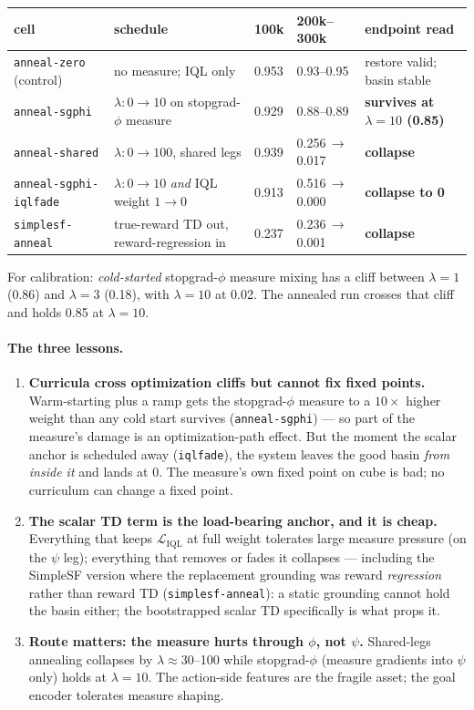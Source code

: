 \documentclass[11pt]{article}
\newcommand{\numgood}[1]{\textbf{\textcolor{green!45!black}{#1}}}
\newcommand{\numbad}[1]{\textbf{\textcolor{red!65!black}{#1}}}
\begin{document}
\begin{center}\small\begin{tabular}{lllll}
\toprule
cell & schedule & 100k & 200k--300k & endpoint read \\
\midrule
\texttt{anneal-zero} (control) & no measure; IQL only & 0.953 & 0.93--0.95 & restore valid; basin stable \\
\texttt{anneal-sgphi} & $\lambda:0\to10$ on stopgrad-$\phi$ measure & 0.929 & 0.88--0.89 & \numgood{survives at $\lambda{=}10$ (0.85)} \\
\texttt{anneal-shared} & $\lambda:0\to100$, shared legs & 0.939 & 0.256\,$\to$\,0.017 & \numbad{collapse} \\
\texttt{anneal-sgphi-iqlfade} & $\lambda:0\to10$ \emph{and} IQL weight $1\to0$ & 0.913 & 0.516\,$\to$\,0.000 & \numbad{collapse to 0} \\
\texttt{simplesf-anneal} & true-reward TD out, reward-regression in & 0.237 & 0.236\,$\to$\,0.001 & \numbad{collapse} \\
\bottomrule
\end{tabular}\end{center}

For calibration: \emph{cold-started} stopgrad-$\phi$ measure mixing has a cliff between
$\lambda=1$ (0.86) and $\lambda=3$ (0.18), with $\lambda=10$ at 0.02. The annealed run
crosses that cliff and holds 0.85 at $\lambda=10$.

\paragraph{The three lessons.}
\begin{enumerate}[leftmargin=1.6em,itemsep=2pt]
\item \textbf{Curricula cross optimization cliffs but cannot fix fixed points.} Warm-starting
plus a ramp gets the stopgrad-$\phi$ measure to a $10\times$ higher weight than any cold
start survives (\texttt{anneal-sgphi}) --- so part of the measure's damage is an
optimization-path effect. But the moment the scalar anchor is scheduled away
(\texttt{iqlfade}), the system leaves the good basin \emph{from inside it} and lands at 0.
The measure's own fixed point on cube is bad; no curriculum can change a fixed point.
\item \textbf{The scalar TD term is the load-bearing anchor, and it is cheap.} Everything
that keeps $\mathcal L_{\mathrm{IQL}}$ at full weight tolerates large measure pressure
(on the $\psi$ leg); everything that removes or fades it collapses --- including the
SimpleSF version where the replacement grounding was reward \emph{regression} rather than
reward TD (\texttt{simplesf-anneal}): a static grounding cannot hold the basin either;
the bootstrapped scalar TD specifically is what props it.
\item \textbf{Route matters: the measure hurts through $\phi$, not $\psi$.} Shared-legs
annealing collapses by $\lambda\approx30$--100 while stopgrad-$\phi$ (measure gradients
into $\psi$ only) holds at $\lambda=10$. The action-side features are the fragile asset;
the goal encoder tolerates measure shaping.
\end{enumerate}
\end{document}
